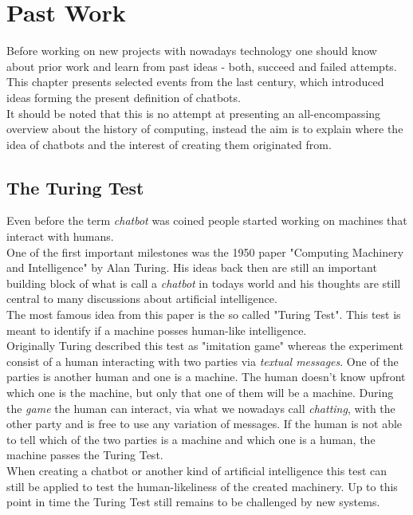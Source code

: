 \section{Past Work}


Before working on new projects with nowadays technology one should know about prior work and learn from past ideas - both, succeed and failed attempts.
\\
This chapter presents selected events from the last century, which introduced ideas forming the present definition of chatbots.
\\
It should be noted that this is no attempt at presenting an all-encompassing overview about the history of computing, instead the aim is to explain where the idea of chatbots and the interest of creating them originated from.


\subsection{The Turing Test}

Even before the term \emph{chatbot} was coined people started working on machines that interact with humans.
\\
One of the first important milestones was the 1950 paper "Computing Machinery and Intelligence" by Alan Turing\cite{turing}. His ideas back then are still an important building block of what is call a \emph{chatbot} in todays world and his thoughts are still central to many discussions about artificial intelligence.
\\
The most famous idea from this paper is the so called "Turing Test". This test is meant to identify if a machine posses human-like intelligence.
\\
Originally Turing described this test as "imitation game" whereas the experiment consist of a human interacting with two parties via \emph{textual messages}. One of the parties is another human and one is a machine. The human doesn't know upfront which one is the machine, but only that one of them will be a machine. During the \emph{game} the human can interact, via what we nowadays call \emph{chatting}, with the other party and is free to use any variation of messages. If the human is not able to tell which of the two parties is a machine and which one is a human, the machine passes the Turing Test.
\\
When creating a chatbot or another kind of artificial intelligence this test can still be applied to test the human-likeliness of the created machinery. Up to this point in time the Turing Test still remains to be challenged by new systems.


